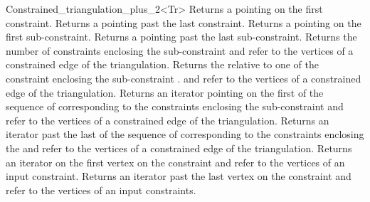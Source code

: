 \begin{ccRefClass}{Constrained_triangulation_plus_2<Tr>}
{Returns a  pointing on the first
constraint.}
\ccGlue
{}
{Returns a  pointing past the last
constraint.}
\ccGlue
{}
{Returns a  pointing on the first
sub-constraint.}
\ccGlue
{}
{Returns a  pointing past the last
sub-constraint.}
\ccGlue
{}
{Returns the number of constraints enclosing the sub-constraint
\ccPrecond {} and  refer to  the vertices
of a constrained edge of the triangulation.}
\ccGlue
{}
{Returns the   relative to  one of the constraint 
enclosing  the sub-constraint  .
\ccPrecond {} and  refer to  the vertices
of a constrained edge of the triangulation.}
\ccGlue
{}
{Returns an iterator pointing on the first 
of the sequence of 
corresponding to the constraints enclosing the sub-constraint
\ccPrecond {} and  refer to  the vertices
of a constrained edge of the triangulation.}
\ccGlue
{}
{Returns an iterator past the last  
of the sequence of 
corresponding to the constraints enclosing the  
\ccPrecond {} and  refer to  the vertices
of a constrained edge of the triangulation.}
\ccGlue
{}
{Returns an iterator on the first vertex on the constraint
\ccPrecond {} and  refer to  the vertices
of an input constraint.}
\ccGlue
{}
{Returns an iterator past  the last  vertex on  the constraint
\ccPrecond {} and  refer to  the vertices
of an input constraints.}


\ccSeeAlso
{} \\
 \\
 \\


\end{ccRefClass}
